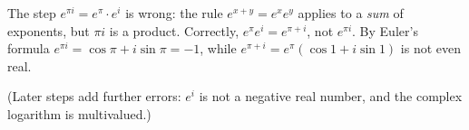 The step $e^{\pi i}=e^\pi\cdot e^i$ is wrong: the rule $e^{x+y}=e^xe^y$ applies to a \emph{sum} of exponents, but $\pi i$ is a product. Correctly, $e^\pi e^i=e^{\pi+i}$, not $e^{\pi i}$. By Euler's formula $e^{\pi i}=\cos\pi+i\sin\pi=-1$, while $e^{\pi+i}=e^\pi(\cos1+i\sin1)$ is not even real.

(Later steps add further errors: $e^i$ is not a negative real number, and the complex logarithm is multivalued.)
